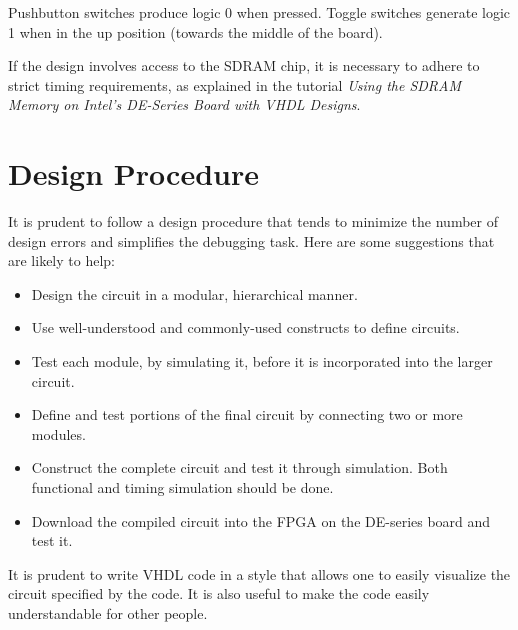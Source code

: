 \documentclass[11pt, twoside, pdftex]{article}
\newcommand{\commonPath}{../../../Common}
\begin{document}
Pushbutton switches produce logic 0 when pressed. Toggle switches
generate logic 1 when in the up position (towards the middle of the board).

If the design involves access to the SDRAM chip, it is necessary to adhere to
strict timing requirements, as explained in the tutorial
{\it Using the SDRAM Memory on Intel's DE-Series Board with VHDL Designs}.

\section{Design Procedure}
It is prudent to follow a design procedure that tends to minimize the number
of design errors and simplifies the debugging task. Here are some suggestions that 
are likely to help:
\begin{itemize}
\item Design the circuit in a modular, hierarchical manner.
\item Use well-understood and commonly-used constructs to define circuits.
\item Test each module, by simulating it, before it is incorporated into 
the larger circuit.
\item Define and test portions of the final circuit by connecting two or
more modules.
\item Construct the complete circuit and test it through simulation.
Both functional and timing simulation should be done.
\item Download the compiled circuit into the FPGA on the DE-series board and
test it.
\end{itemize}

It is prudent to write VHDL code in a style that allows one to easily
visualize the circuit specified by the code. It is also useful to make 
the code easily understandable for other people.   



\end{document}
